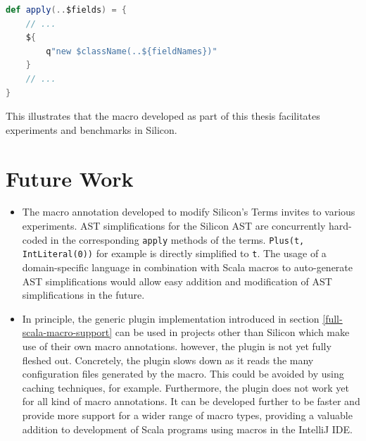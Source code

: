 \documentclass[11pt]{article}
\begin{document}
    \begin{lstlisting}[language=Scala, caption=Modified macro to ignore AST simplifications.]
def apply(..$fields) = {
    // ...
    ${
        q"new $className(..${fieldNames})"
    }
    // ...
}  
    \end{lstlisting}

    This illustrates that the macro developed as part of this thesis
    facilitates experiments and benchmarks in Silicon.



    \newpage
    \section{Future Work}

    \begin{itemize}
        \item The macro annotation developed to modify Silicon's Terms
            invites to various experiments. AST simplifications
            for the Silicon AST are concurrently hard-coded in the corresponding \texttt{apply}
            methods of the terms. \texttt{Plus(t, IntLiteral(0))} for example is directly
            simplified to \texttt{t}.
            The usage of a domain-specific language in combination with Scala macros to
            auto-generate AST
            simplifications would allow easy addition and modification
            of AST simplifications in the future. 
        \item In principle, the generic plugin implementation introduced in
            section \ref{full-scala-macro-support} can be used in projects other
            than Silicon which make use of their own macro annotations.
            however, the plugin is not yet fully fleshed out. Concretely,
            the plugin slows down as it reads the many configuration 
            files generated by the macro. This could be avoided by
            using caching techniques, for example. 
            Furthermore, the plugin does not work yet for
            all kind of macro annotations.
            It can be developed
            further to be faster and provide more support for a
            wider range of macro types, providing a valuable addition to
            development of Scala programs using macros in the IntelliJ IDE.
    \end{itemize}

    \newpage
\end{document}
